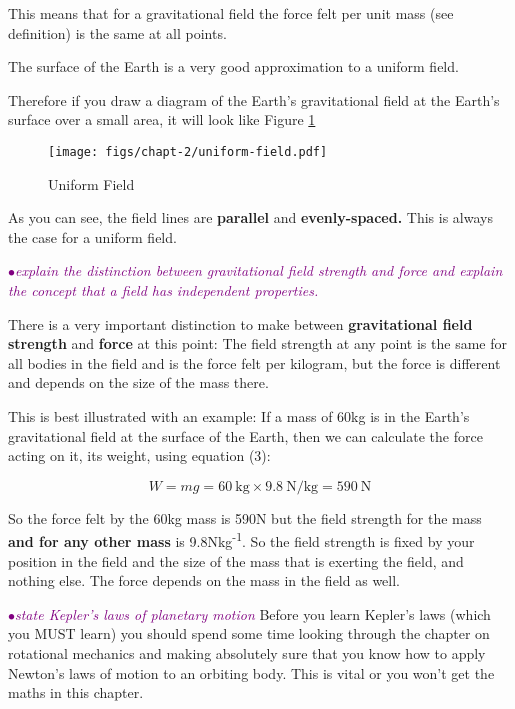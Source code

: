 \documentclass[a4paper,11pt,twoside]{memoir}
\newcounter{spec}[chapter]
\newcommand{\spec}[1]{\Needspace{5\baselineskip}\textcolor{purple}{$\bullet$\hspace{0.5cm}\textit{#1}}}
\begin{document}
This means that for a gravitational field the force felt per unit mass
(see definition) is the same at all points.

The surface of the Earth is a very good approximation to a uniform
field.

Therefore if you draw a diagram of the Earth's gravitational field at
the Earth's surface over a small area, it will look like Figure \ref{fig:uniform-field}

\begin{figure}[!h]
	\begin{center}
		\texttt{[image: figs/chapt-2/uniform-field.pdf]}
	\end{center}
	\caption{Uniform Field}
	\label{fig:uniform-field}
\end{figure}

As you can see, the field lines are \textbf{parallel} and
\textbf{evenly-spaced.} This is always the case for a uniform field.

\spec{explain the distinction between gravitational field strength and force and explain the concept that a field has independent properties.}

There is a very important distinction to make between
\textbf{gravitational field strength} and \textbf{force} at this point:
The field strength at any point is the same for all bodies in the field
and is the force felt per kilogram, but the force is different and
depends on the size of the mass there.

This is best illustrated with an example: If a mass of 60kg is in the
Earth's gravitational field at the surface of the Earth, then we can
calculate the force acting on it, its weight, using equation (3):

\[W = mg = \SI{60}{\kg} \times \SI{9.8}{\N\per\kg} = \SI{590}{\N}\]

So the force felt by the 60kg mass is 590N but the field strength for
the mass \textbf{and for any other mass} is 9.8Nkg\textsuperscript{-1}.
So the field strength is fixed by your position in the field and the
size of the mass that is exerting the field, and nothing else. The force
depends on the mass in the field as well.

\spec{state Kepler's laws of planetary motion}
Before you learn Kepler's laws (which you MUST learn) you should spend
some time looking through the chapter on rotational mechanics and making
absolutely sure that you know how to apply Newton's laws of motion to an
orbiting body. This is vital or you won't get the maths in this chapter.
\end{document}
